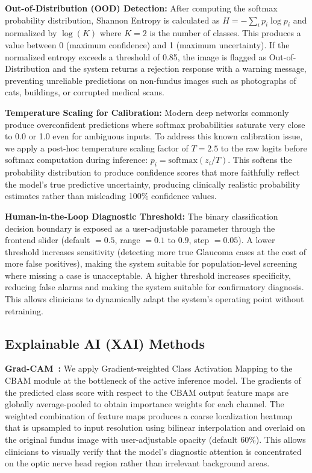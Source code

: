 \documentclass[conference]{IEEEtran}
\begin{document}
\textbf{Out-of-Distribution (OOD) Detection:} After computing the softmax probability distribution, Shannon Entropy is calculated as $H = -\sum_{i} p_i \log p_i$ and normalized by $\log(K)$ where $K{=}2$ is the number of classes. This produces a value between 0 (maximum confidence) and 1 (maximum uncertainty). If the normalized entropy exceeds a threshold of 0.85, the image is flagged as Out-of-Distribution and the system returns a rejection response with a warning message, preventing unreliable predictions on non-fundus images such as photographs of cats, buildings, or corrupted medical scans.

\textbf{Temperature Scaling for Calibration:} Modern deep networks commonly produce overconfident predictions where softmax probabilities saturate very close to 0.0 or 1.0 even for ambiguous inputs. To address this known calibration issue, we apply a post-hoc temperature scaling factor of $T{=}2.5$ to the raw logits before softmax computation during inference: $p_i = \text{softmax}(z_i / T)$. This softens the probability distribution to produce confidence scores that more faithfully reflect the model's true predictive uncertainty, producing clinically realistic probability estimates rather than misleading 100\% confidence values.

\textbf{Human-in-the-Loop Diagnostic Threshold:} The binary classification decision boundary is exposed as a user-adjustable parameter through the frontend slider (default $= 0.5$, range $= 0.1$ to $0.9$, step $= 0.05$). A lower threshold increases sensitivity (detecting more true Glaucoma cases at the cost of more false positives), making the system suitable for population-level screening where missing a case is unacceptable. A higher threshold increases specificity, reducing false alarms and making the system suitable for confirmatory diagnosis. This allows clinicians to dynamically adapt the system's operating point without retraining.

\subsection{Explainable AI (XAI) Methods}

\textbf{Grad-CAM~\cite{selvaraju2017}:} We apply Gradient-weighted Class Activation Mapping to the CBAM module at the bottleneck of the active inference model. The gradients of the predicted class score with respect to the CBAM output feature maps are globally average-pooled to obtain importance weights for each channel. The weighted combination of feature maps produces a coarse localization heatmap that is upsampled to input resolution using bilinear interpolation and overlaid on the original fundus image with user-adjustable opacity (default 60\%). This allows clinicians to visually verify that the model's diagnostic attention is concentrated on the optic nerve head region rather than irrelevant background areas.
\end{document}
